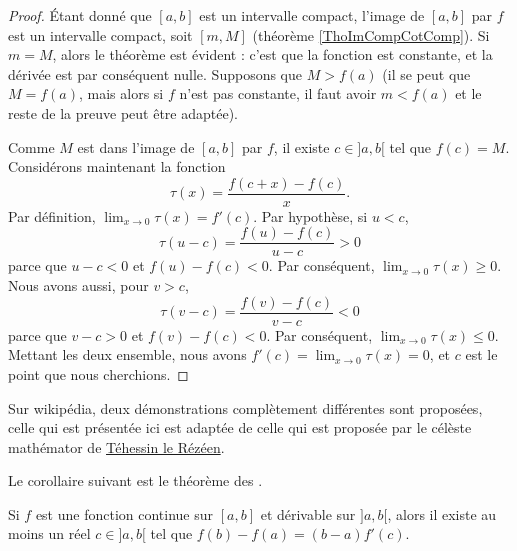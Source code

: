 \begin{proof}
    Étant donné que $[a,b]$ est un intervalle compact, l'image de $[a,b]$ par $f$ est un intervalle compact, soit $[m,M]$ (théorème \ref{ThoImCompCotComp}). Si $m=M$, alors le théorème est évident : c'est que la fonction est constante, et la dérivée est par conséquent nulle. Supposons que $M> f(a)$ (il se peut que $M=f(a)$, mais alors si $f$ n'est pas constante, il faut avoir $m<f(a)$ et le reste de la preuve peut être adaptée).

    Comme $M$ est dans l'image de $[a,b]$ par $f$, il existe $c\in ]a,b[$ tel que $f(c)=M$. Considérons maintenant la fonction
    \begin{equation}
        \tau(x) =\frac{ f(c+x)-f(c) }{ x }.
    \end{equation}
    Par définition, $\lim_{x\to 0}\tau(x)=f'(c)$. Par hypothèse, si $u<c$,
    \begin{equation}
        \tau(u-c) = \frac{ f(u)-f(c) }{ u-c }>0
    \end{equation}
    parce que $u-c<0$ et $f(u)-f(c)<0$. Par conséquent, $\lim_{x\to 0}\tau(x)\geq 0$. Nous avons aussi, pour $v>c$,
    \begin{equation}
        \tau(v-c) = \frac{ f(v)-f(c) }{ v-c }<0
    \end{equation}
    parce que $v-c>0$ et $f(v)-f(c)<0$. Par conséquent, $\lim_{x\to 0}\tau(x)\leq 0$. Mettant les deux ensemble, nous avons $f'(c)=\lim_{x\to 0}\tau(x)=0$, et $c$ est le point que nous cherchions.
\end{proof}

Sur wikipédia, deux démonstrations complètement différentes sont proposées, celle qui est présentée ici est adaptée de celle qui est proposée par le célèste mathémator de \href{http://gconnan.free.fr/les\%20pdf/Deriv.pdf}{Téhessin le Rézéen}.

Le corollaire suivant est le théorème des .

\begin{theorem}       \label{ThoAccFinis}
    Si $f$ est une fonction continue sur $[a,b]$ et dérivable sur $]a,b[$, alors il existe au moins un réel $c\in]a,b[$ tel que $f(b)-f(a)=(b-a)f'(c)$.
\end{theorem}


